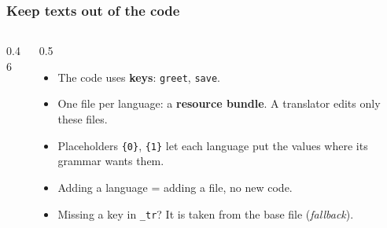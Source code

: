 \documentclass[aspectratio=169,10pt,compress]{beamer}
\begin{document}
\begin{frame}[t,fragile] \frametitle{Keep texts out of the code}
  \begin{columns}[T]
    \begin{column}{0.46\textwidth}
      \begin{center}
      \end{center}
    \end{column}
    \begin{column}{0.5\textwidth}
      \begin{itemize}\small
        \item The code uses \textbf{keys}: \texttt{greet}, \texttt{save}.
        \item One file per language: a \textbf{resource bundle}. A translator edits only these files.
        \item Placeholders \texttt{\{0\}}, \texttt{\{1\}} let each language put the values where its
          grammar wants them.
        \item Adding a language = adding a file, no new code.
        \item Missing a key in \texttt{\_tr}? It is taken from the base file (\emph{fallback}).
      \end{itemize}
    \end{column}
  \end{columns}
\end{frame}
\end{document}
